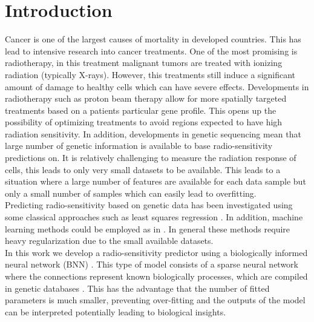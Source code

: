 \documentclass[NOTE, disdraft=true, UKenglish]{\DISCDTLATEXPATH UCLCDTDISdoc}
\begin{document}
\maketitle

\tableofcontents

\clearpage


\newpage

\newpage
\section{Introduction}
\label{sec:introduction}
Cancer is one of the largest causes of mortality in developed countries. This has lead to intensive research into cancer treatments. One of the most promising is radiotherapy, in this treatment malignant tumors are treated with ionizing radiation (typically X-rays). However, this treatments still induce a significant amount of damage to healthy cells which can have severe effects.
Developments in radiotherapy such as proton beam therapy \cite{proton_beam} allow for more spatially targeted treatments based on a patients particular gene profile. This opens up the possibility of optimizing treatments to avoid regions expected to have high radiation sensitivity. In addition, developments in genetic sequencing mean that large number of genetic information is available to base radio-sensitivity predictions on. It is relatively challenging to measure the radiation response of cells, this leads to only very small datasets to be available. This leads to a situation where a large number of features are available for each data sample but only a small number of samples which can easily lead to overfitting.
\\ \indent 
Predicting radio-sensitivity based on genetic data has been investigated using some classical approaches such as least squares regression \cite{SCOTT2017202}. In addition, machine learning methods could be employed as in \cite{speers2015development}. In general these methods require heavy regularization due to the small available datasets.
\\ \indent  In this work we develop a radio-sensitivity predictor using a biologically informed neural network (BNN) \cite{review,review_2}. This type of model consists of a sparse neural network where the connections represent known biologically processes, which are compiled in genetic databases \cite{Reactome,gene_ontology}. This has the advantage that the number of fitted parameters is much smaller, preventing over-fitting and the outputs of the model can be interpreted potentially leading to biological insights.
\end{document}
